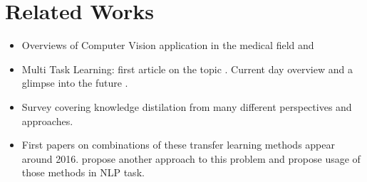 \documentclass{article}
\begin{document}
\section{Related Works}

\begin{itemize}
        \item Overviews of Computer Vision application in the medical field  \cite{OverviewMedical1} and \cite{OverviewMedical2}
        \item Multi Task Learning: first article on the topic  \cite{Multitask1}. Current day overview and a glimpse into the future \cite{Multitask2}.
        \item Survey covering knowledge distilation \cite{KD1} from many different perspectives and approaches.
        \item First papers on combinations of these transfer learning methods appear around 2016. \cite{MTKD2} propose another approach to this problem and \cite{MTKD1} propose usage of those methods in NLP task.
\end{itemize}
\end{document}
